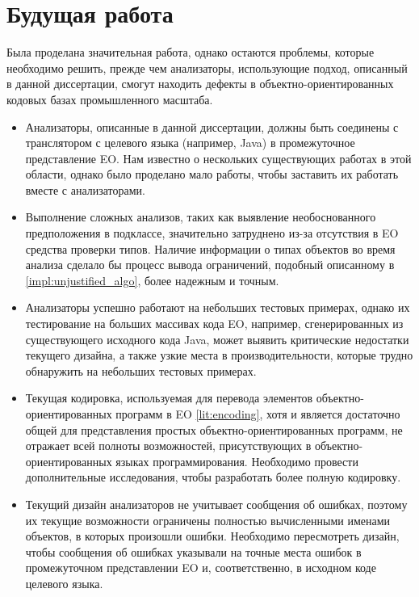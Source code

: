 \section{Будущая работа}
Была проделана значительная работа, однако остаются проблемы, которые необходимо решить, прежде чем анализаторы, использующие подход, описанный в данной диссертации, смогут находить дефекты в объектно-ориентированных кодовых базах промышленного масштаба. 

\begin{itemize}
    \item Анализаторы, описанные в данной диссертации, должны быть соединены с транслятором с целевого языка (например, Java) в промежуточное представление EO. Нам известно о нескольких существующих работах в этой области, однако было проделано мало работы, чтобы заставить их работать вместе с анализаторами.
    \item Выполнение сложных анализов, таких как выявление необоснованного предположения в подклассе, значительно затруднено из-за отсутствия в EO средства проверки типов. Наличие информации о типах объектов во время анализа сделало бы процесс вывода ограничений, подобный описанному в \ref{impl:unjustified_algo}, более надежным и точным. 
    \item Анализаторы успешно работают на небольших тестовых примерах, однако их тестирование на больших массивах кода EO, например, сгенерированных из существующего исходного кода Java, может выявить критические недостатки текущего дизайна, а также узкие места в производительности, которые трудно обнаружить на небольших тестовых примерах. 
    \item Текущая кодировка, используемая для перевода элементов объектно-ориентированных программ в EO \ref{lit:encoding}, хотя и является достаточно общей для представления простых объектно-ориентированных программ, не отражает всей полноты возможностей, присутствующих в объектно-ориентированных языках программирования. Необходимо провести дополнительные исследования, чтобы разработать более полную кодировку. 
    \item Текущий дизайн анализаторов не учитывает сообщения об ошибках, поэтому их текущие возможности ограничены полностью вычисленными именами объектов, в которых произошли ошибки. Необходимо пересмотреть дизайн, чтобы сообщения об ошибках указывали на точные места ошибок в промежуточном представлении EO и, соответственно, в исходном коде целевого языка.
\end{itemize}

